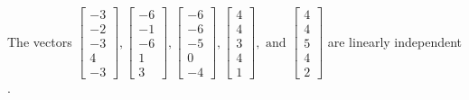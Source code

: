 \begin{exercise}
\begin{exerciseStatement}
  \end{exerciseStatement}
  \begin{exerciseAnswer}
   The vectors \(\left[\begin{array}{r}
-3 \\
-2 \\
-3 \\
4 \\
-3
\end{array}\right] , \left[\begin{array}{r}
-6 \\
-1 \\
-6 \\
1 \\
3
\end{array}\right] , \left[\begin{array}{r}
-6 \\
-6 \\
-5 \\
0 \\
-4
\end{array}\right] , \left[\begin{array}{r}
4 \\
4 \\
3 \\
4 \\
1
\end{array}\right] , \text{ and } \left[\begin{array}{r}
4 \\
4 \\
5 \\
4 \\
2
\end{array}\right]\) are 
  	 linearly independent  .
  


  \end{exerciseAnswer}
\end{exercise}